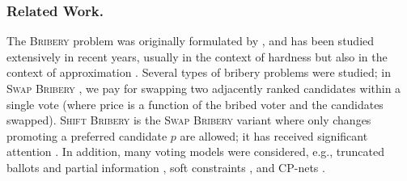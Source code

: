 \documentclass[letterpaper]{article} %
\newcommand{\Bribery}{\textsc{Bribery}}
\newcommand{\swapB}{\textsc{Swap Bribery}}
\newcommand{\shiftB}{\textsc{Shift Bribery}}
\begin{document}








\subsubsection{Related Work.}
The \Bribery{} problem was originally formulated by  \citet{faliszewski2006complexity,DBLP:journals/jair/FaliszewskiHH09}, and has been studied extensively in recent years, usually in the context of hardness \citep[see a survey by][]{DBLP:reference/choice/FaliszewskiR16} but also in the context of approximation \cite{DBLP:conf/atal/Faliszewski08, DBLP:journals/jair/KellerHH19a}. Several types of bribery problems were studied; in \swapB{} \cite{DBLP:conf/sagt/ElkindFS09,elkind2010approximation}, we pay for swapping two adjacently ranked candidates within a single vote (where price is a function of the bribed voter and the candidates swapped). \shiftB{} is the \swapB{} variant where only changes promoting a preferred candidate $p$ are allowed; it has received significant attention \cite{DBLP:journals/algorithmica/SchlotterFE17,DBLP:conf/aaai/FaliszewskiMS19,DBLP:conf/atal/MaushagenNRS18,DBLP:journals/iandc/BredereckCFNN16,DBLP:conf/aaai/BredereckFNT16,DBLP:journals/jair/BredereckFNT16}. In addition, many voting models were considered, e.g., truncated ballots and partial information \cite{baumeister2012campaigns,DBLP:conf/atal/BriskornER16}, soft constraints \cite{pini2013bribery}, and CP-nets \cite{mattei2012bribery,dorn2016hardness}.
\end{document}
